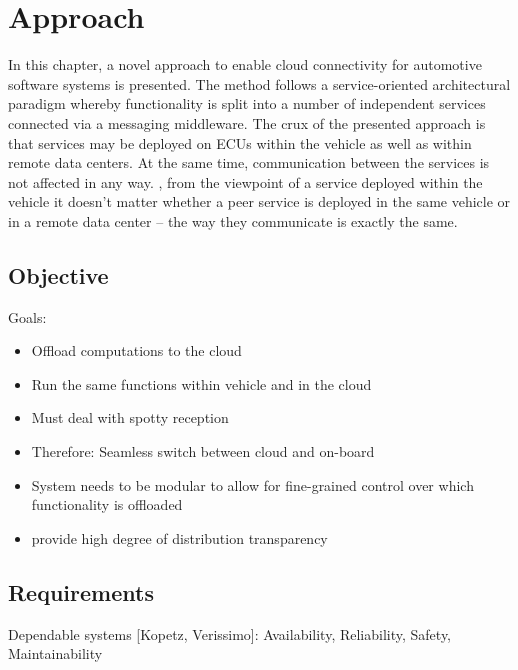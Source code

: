 
\chapter{Approach}\label{chapter:realization}

In this chapter, a novel approach to enable cloud connectivity for automotive software systems is presented. The method follows a service-oriented architectural paradigm whereby functionality is split into a number of independent services connected via a messaging middleware.  
The crux of the presented approach is that services may be deployed on ECUs within the vehicle as well as within remote data centers. At the same time, communication between the services is not affected in any way. \Ie , from the viewpoint of a service deployed within the vehicle it doesn't matter whether a peer service is deployed in the same vehicle or in a remote data center -- the way they communicate is exactly the same.

%
%
%
%
%
%
%
%
%
%

\section{Objective}

Goals:
\begin{itemize}
\item Offload computations to the cloud
\item Run the same functions within vehicle and in the cloud
\item Must deal with spotty reception
\item Therefore: Seamless switch between cloud and on-board
\item System needs to be modular to allow for fine-grained control over which functionality is offloaded 
\item provide high degree of distribution transparency
\end{itemize}


\section{Requirements}
Dependable systems [Kopetz, Verissimo]: Availability, Reliability, Safety, Maintainability

